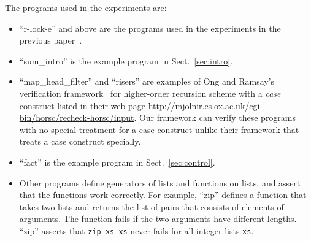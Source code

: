 The programs used in the experiments are:
\begin{itemize}
\item ``r-lock-e'' and above are the programs used in the experiments in
      the previous paper~\cite{KobayashiPLDI2011}.
\item ``sum\_intro'' is the example program in Sect.~\ref{sec:intro}.
\item ``map\_head\_filter'' and ``risers'' are examples of Ong and
      Ramsay's verification framework~\cite{Ong2011} for higher-order
      recursion scheme with a \textit{case} construct listed in their
      web page
      \url{http://mjolnir.cs.ox.ac.uk/cgi-bin/horsc/recheck-horsc/input}.
      Our framework can verify these programs with no special treatment
      for a case construct unlike their framework that treats a case construct specially.
\item ``fact'' is the example program in Sect.~\ref{sec:control}.
\item Other programs define generators of lists and functions on lists,
      and assert that the functions work correctly.  For example,
      ``zip'' defines a function that takes two lists and returns the
      list of pairs that consists of elements of arguments.
      The function fails if the two arguments have different lengths.
      ``zip'' asserts that \texttt{zip xs xs} never fails for all integer lists \texttt{xs}.
\end{itemize}
